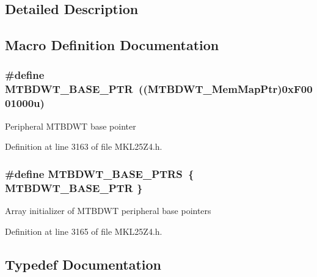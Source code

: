 \subsection{Detailed Description}


\subsection{Macro Definition Documentation}
\subsubsection[{\texorpdfstring{M\+T\+B\+D\+W\+T\+\_\+\+B\+A\+S\+E\+\_\+\+P\+TR}{MTBDWT_BASE_PTR}}]{\setlength{\rightskip}{0pt plus 5cm}\#define M\+T\+B\+D\+W\+T\+\_\+\+B\+A\+S\+E\+\_\+\+P\+TR~(({\bf M\+T\+B\+D\+W\+T\+\_\+\+Mem\+Map\+Ptr})0x\+F0001000u)}\hypertarget{group___m_t_b_d_w_t___peripheral_ga97d048bfb5a11293a38c444b8347ff42}{}\label{group___m_t_b_d_w_t___peripheral_ga97d048bfb5a11293a38c444b8347ff42}
Peripheral M\+T\+B\+D\+WT base pointer 

Definition at line 3163 of file M\+K\+L25\+Z4.\+h.

\subsubsection[{\texorpdfstring{M\+T\+B\+D\+W\+T\+\_\+\+B\+A\+S\+E\+\_\+\+P\+T\+RS}{MTBDWT_BASE_PTRS}}]{\setlength{\rightskip}{0pt plus 5cm}\#define M\+T\+B\+D\+W\+T\+\_\+\+B\+A\+S\+E\+\_\+\+P\+T\+RS~\{ {\bf M\+T\+B\+D\+W\+T\+\_\+\+B\+A\+S\+E\+\_\+\+P\+TR} \}}\hypertarget{group___m_t_b_d_w_t___peripheral_ga0cbd89263cdbe0c07c59ed21112ea9ad}{}\label{group___m_t_b_d_w_t___peripheral_ga0cbd89263cdbe0c07c59ed21112ea9ad}
Array initializer of M\+T\+B\+D\+WT peripheral base pointers 

Definition at line 3165 of file M\+K\+L25\+Z4.\+h.



\subsection{Typedef Documentation}
